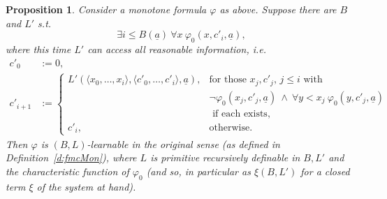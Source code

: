 \documentclass[1p]{elsarticle}
\newcommand{\tup}{\underline} %
\newcommand{\Telse}{\text{otherwise}}
\theoremstyle{plain}
\newtheorem{prop}[thm]{Proposition}
\theoremstyle{definition}
\theoremstyle{remark}
\renewcommand{\phi}{\varphi}
\theoremstyle{definition}
\begin{document}
\begin{prop}\label{p:allx}
Consider a monotone formula $\phi$ as above. Suppose there are $B$ and $L'$ s.t.
\[ \exists i\leq B(\tup a)\ \forall x\ \phi_0(x,c'_i,\tup a),\] where this 
time $L'$ can access all reasonable information, i.e.
\begin{align*}
c'_0&:=0,\\
c'_{i+1}&:=
\begin{cases}
L'(\langle x_0,\ldots,x_i\rangle, \langle c'_0,\ldots,c'_i\rangle,\tup a), &\text{for those $x_j,c'_j$, $j\leq i$ with }\\
 &\neg\phi_0(x_j,c'_j,\tup a)\ \wedge\ \forall y<x_j\ \phi_0(y,c'_j,\tup a)\\
  &\text{ if each exists},\\
c'_i, &\Telse.
\end{cases}
\end{align*}
Then $\phi$ is $(B,L)$-learnable in the original sense (as defined in Definition~\ref{d:fmcMon}), where $L$ is primitive recursively definable in $B,L'$ and 
the characteristic function of $\varphi_0$ (and so, in particular as 
$\xi(B,L')$ for a closed term $\xi$ of the system at hand).
\end{prop}
\end{document}
